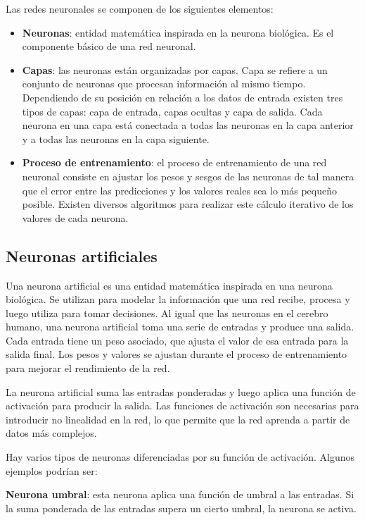 Las redes neuronales se componen de los siguientes elementos:
\begin{itemize}
\tightlist
\item \textbf{Neuronas}: entidad matemática inspirada en la neurona biológica. Es el componente básico de una red neuronal. 
\item \textbf{Capas}: las neuronas están organizadas por capas. Capa se refiere a un conjunto de neuronas que procesan información al mismo tiempo. Dependiendo de su posición en relación a los datos de entrada existen tres tipos de capas: capa de entrada, capas ocultas y capa de salida. Cada neurona en una capa está conectada a todas las neuronas en la capa anterior y a todas las neuronas en la capa siguiente.
\item \textbf{Proceso de entrenamiento}: el proceso de entrenamiento de una red neuronal consiste en ajustar los pesos y sesgos de las neuronas de tal manera que el error entre las predicciones y los valores reales sea lo más pequeño posible. Existen diversos algoritmos para realizar este cálculo iterativo de los valores de cada neurona.
\end{itemize}

\subsection{Neuronas artificiales}
Una neurona artificial es una entidad matemática inspirada en una neurona biológica. Se utilizan para modelar la información que una red recibe, procesa y luego utiliza para tomar decisiones.
Al igual que las neuronas en el cerebro humano, una neurona artificial toma una serie de entradas y produce una salida. Cada entrada tiene un peso asociado, que ajusta el valor de esa entrada para la salida final. Los pesos y valores se ajustan durante el proceso de entrenamiento para mejorar el rendimiento de la red.

La neurona artificial suma las entradas ponderadas y luego aplica una función de activación para producir la salida. Las funciones de activación son necesarias para introducir no linealidad en la red, lo que permite que la red aprenda a partir de datos más complejos.

Hay varios tipos de neuronas diferenciadas por su función de activación. Algunos ejemplos podrían ser:

\textbf{Neurona umbral}: esta neurona aplica una función de umbral a las entradas. Si la suma ponderada de las entradas supera un cierto umbral, la neurona se activa.

